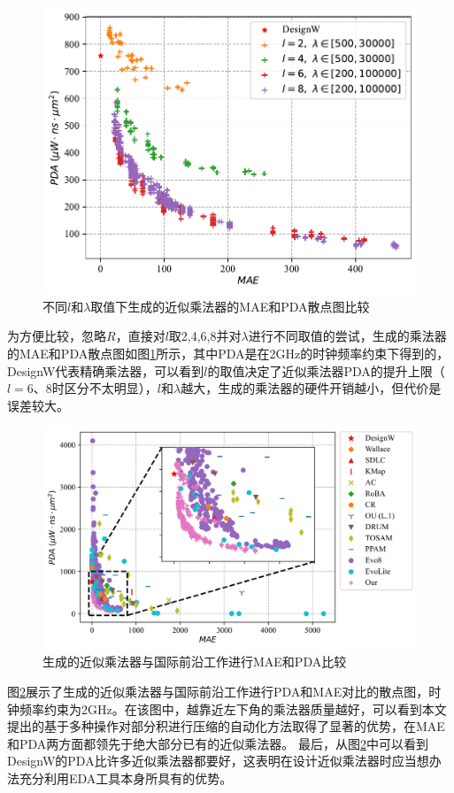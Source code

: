 \begin{figure}[!h]
    \centering
    \includegraphics[width=0.8\linewidth]{figs/AC-AM-Adapt-uniform_8x8_diff_l.pdf}
    \caption{不同$l$和$\lambda$取值下生成的近似乘法器的MAE和PDA散点图比较}
    \label{AC:AM:Adapt:Fig:uniform_8x8_diff_l}
\end{figure}

为方便比较，忽略$R$，直接对$l$取2,4,6,8并对$\lambda$进行不同取值的尝试，生成的乘法器的MAE和PDA散点图如图\ref{AC:AM:Adapt:Fig:uniform_8x8_diff_l}所示，其中PDA是在2GHz的时钟频率约束下得到的，DesignW代表精确乘法器，可以看到$l$的取值决定了近似乘法器PDA的提升上限（$l=6$、8时区分不太明显），$l$和$\lambda$越大，生成的乘法器的硬件开销越小，但代价是误差较大。

\begin{figure}[!h]
    \centering
    \includegraphics[width=\linewidth]{figs/AC-AM-Adapt-uniform_8x8_PDA_MAE.png}
    \caption{生成的近似乘法器与国际前沿工作进行MAE和PDA比较}
    \label{AC:AM:Adapt:Fig:uniform_8x8_PDA_MAE}
\end{figure}
图\ref{AC:AM:Adapt:Fig:uniform_8x8_PDA_MAE}展示了生成的近似乘法器与国际前沿工作进行PDA和MAE对比的散点图，时钟频率约束为2GHz。在该图中，越靠近左下角的乘法器质量越好，可以看到本文提出的基于多种操作对部分积进行压缩的自动化方法取得了显著的优势，在MAE和PDA两方面都领先于绝大部分已有的近似乘法器。
最后，从图\ref{AC:AM:Adapt:Fig:uniform_8x8_PDA_MAE}中可以看到DesignW的PDA比许多近似乘法器都要好，这表明在设计近似乘法器时应当想办法充分利用EDA工具本身所具有的优势。


